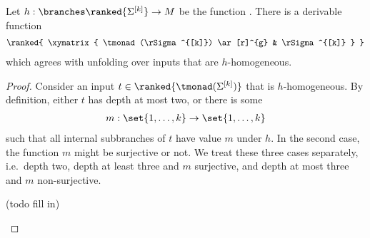 \begin{lemma}\label{lem:homo-unfold}
    Let $h : \branches \ranked{\Sigma^{[k]}} \to M$ be the function .
    There is a derivable function 
\begin{align*}
    \ranked{
        \xymatrix{
              \tmonad (\rSigma^{[k]})  \ar[r]^{g} & \rSigma^{[k]} 
        }
    }
\end{align*}
which agrees with unfolding over inputs that are $h$-homogeneous.
\end{lemma}
\begin{proof} Consider an input $t \in \ranked{\tmonad (\Sigma^{[k]})}$ that is $h$-homogeneous. By definition, either $t$ has depth at most two, or there is some 
    \begin{align*}
        m : \set{1,\ldots,k} \to \set{1,\ldots,k}
    \end{align*}
    such that all internal subbranches of $t$ have value $m$ under $h$. In the second case, the function $m$ might be surjective or not. We treat these three cases separately, i.e.~depth two, depth at least three  and $m$ surjective, and depth at most three and $m$ non-surjective.
    \begin{center}
        (todo fill in)
    \end{center}
\end{proof}





